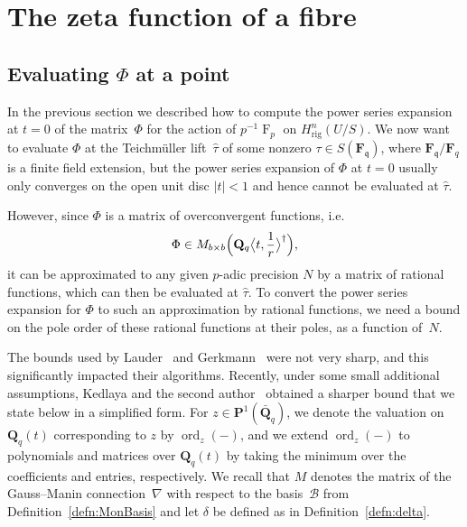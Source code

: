 \documentclass[a4paper,11pt]{article}
\numberwithin{equation}{section}
\providecommand{\abs}[1]{\lvert#1\rvert}                 %
\newcommand{\QQ}{\mathbf{Q}} %
\newcommand{\FF}{\mathbf{F}} %
\DeclareMathOperator{\ord}{ord}          %
\DeclareMathOperator{\Frob}{F}           %
\providecommand{\Hrig}{H_{\text{rig}}}  %
\providecommand{\cB}{\mathcal{B}} %
\theoremstyle{definition}
\begin{document}

\section{The zeta function of a fibre}

\label{sec:ZetaFunctions}

\subsection{Evaluating $\Phi$ at a point}

In the previous section we described how to compute the power series 
expansion at $t=0$ of the matrix~$\Phi$ for the action of $p^{-1} \Frob_p$ on 
$\Hrig^{n}(U/S)$. We now want to evaluate $\Phi$ at the Teichm\"uller 
lift~$\hat{\tau}$ of some nonzero $\tau \in S(\FF_{\mathfrak{q}})$, 
where $\FF_{\mathfrak{q}}/\FF_q$ is a finite field extension, but 
the power series expansion of $\Phi$ 
at $t=0$ usually only converges on the open unit disc $\abs{t} < 1$ 
and hence cannot be evaluated at $\hat{\tau}$. 

However, since $\Phi$ is a matrix of overconvergent functions, i.e.\ 
\[
\Phi \in M_{b \times b}\Bigl(\QQ_q \bigl\langle t,\frac{1}{r} \bigr\rangle^{\dag}\Bigr),
\]
it can be approximated to any given $p$-adic precision $N$ by a matrix 
of rational functions, which can then be evaluated at $\hat{\tau}$. To 
convert the power series expansion for $\Phi$ to such an approximation 
by rational functions, we need a bound on the pole order of these 
rational functions at their poles, as a function of~$N$.

The bounds used by Lauder~\citep[\S 8.1]{Lauder2004a} and 
Gerkmann~\citep[\S 6]{Gerkmann2007} were not very sharp, 
and this significantly impacted their algorithms.
Recently, under some small additional assumptions, Kedlaya and the second 
author~\citep[Theorem~2.1]{KedlayaTuitman2012} obtained a sharper bound 
that we state below in a simplified form. For $z \in \mathbf{P}^1(\bar{\QQ}_q)$, we
denote the valuation on $\QQ_q(t)$ corresponding to $z$ by $\ord_z(-)$, and
we extend $\ord_z(-)$ to polynomials and matrices over $\QQ_q(t)$ by
taking the minimum over the coefficients and entries, respectively.
We recall that $M$ denotes the matrix of the Gauss--Manin connection~$\nabla$
with respect to the basis~$\cB$ from Definition~\ref{defn:MonBasis} 
and let $\delta$ be defined as in Definition~\ref{defn:delta}.
\end{document}
